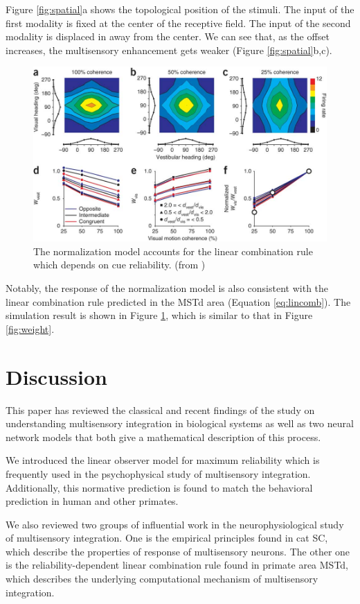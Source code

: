 \documentclass{article}[11pt]
\begin{document}
Figure \ref{fig:spatial}a shows the topological position of the stimuli. The input of the first modality is fixed at the center of the receptive field. The input of the second modality is displaced in away from the center. We can see that, as the offset increases, the multisensory enhancement gets weaker (Figure \ref{fig:spatial}b,c).

\begin{figure}[tpb]
  \centering
  \includegraphics[width=.8\textwidth]{normweight}
  \caption{The normalization model accounts for the linear combination rule which depends on cue reliability. (from \cite{ohshiro_normalization_2011})}
  \label{fig:normweight}
\end{figure}

Notably, the response of the normalization model is also consistent with the linear combination rule predicted in the MSTd area (Equation \ref{eq:lincomb}). The simulation result is shown in Figure \ref{fig:normweight}, which is similar to that in Figure \ref{fig:weight}.

\section{Discussion}
This paper has reviewed the classical and recent findings of the study on understanding multisensory integration in biological systems as well as two neural network models that both give a mathematical description of this process. 

We introduced the linear observer model for maximum reliability which is frequently used in the psychophysical study of multisensory integration. Additionally, this normative prediction is found to match the behavioral prediction in human and other primates.

We also reviewed two groups of influential work in the neurophysiological study of multisensory integration. One is the empirical principles found in cat SC, which describe the properties of response of multisensory neurons. The other one is the reliability-dependent linear combination rule found in primate area MSTd, which describes the underlying computational mechanism of multisensory integration.
\end{document}
